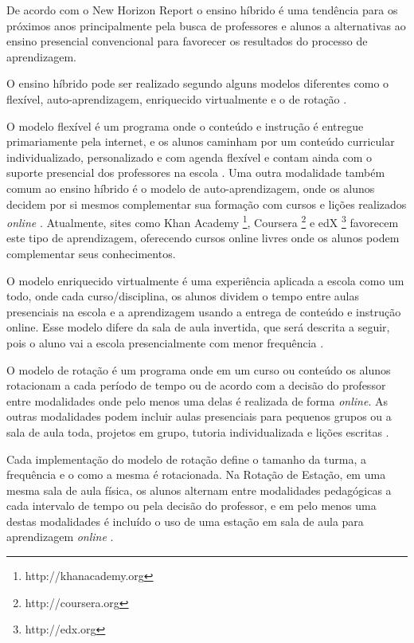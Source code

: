 
De acordo com o New Horizon Report \cite{horizon_report_he_2015} o ensino híbrido é uma tendência para os próximos anos principalmente pela busca de professores e alunos a alternativas ao ensino presencial convencional para favorecer os resultados do processo de aprendizagem.

O ensino híbrido pode ser realizado segundo alguns modelos diferentes como o flexível, auto-aprendizagem, enriquecido virtualmente e o de rotação \cite{staker_classifying_2012}.


O modelo flexível é um programa onde o conteúdo e instrução é entregue primariamente pela internet, e os alunos caminham por um conteúdo curricular individualizado, personalizado e com agenda flexível e contam ainda com o suporte presencial dos professores na escola \cite{staker_classifying_2012}. Uma outra modalidade também comum ao ensino híbrido é o modelo de auto-aprendizagem, onde os alunos decidem por si mesmos complementar sua formação com cursos e lições realizados \emph{online} \cite{horn_rise_2011}. Atualmente, sites como Khan Academy \footnote{http://khanacademy.org}, Coursera \footnote{http://coursera.org} e edX \footnote{http://edx.org} favorecem este tipo de aprendizagem, oferecendo cursos online livres onde os alunos podem complementar seus conhecimentos.

O modelo enriquecido virtualmente é uma experiência aplicada a escola como um todo, onde cada curso/disciplina, os alunos dividem o tempo entre aulas presenciais na escola e a aprendizagem usando a entrega de conteúdo e instrução online. Esse modelo difere da sala de aula invertida, que será descrita a seguir, pois o aluno vai a escola presencialmente com menor frequência \cite{staker_classifying_2012}.


O modelo de rotação é um programa onde em um curso ou conteúdo os alunos rotacionam a cada período de tempo ou de acordo com a decisão do professor entre modalidades onde pelo menos uma delas é realizada de forma \emph{online}. As outras modalidades podem incluir aulas presenciais para pequenos grupos ou a sala de aula toda, projetos em grupo, tutoria individualizada e lições escritas \cite{staker_classifying_2012}.

Cada implementação do modelo de rotação define o tamanho da turma, a frequência e o como a mesma é rotacionada. Na Rotação de Estação, em uma mesma sala de aula física, os alunos alternam entre modalidades pedagógicas a cada intervalo de tempo ou pela decisão do professor, e em pelo menos uma destas modalidades é incluído o uso de uma estação em sala de aula para aprendizagem \emph{online} \cite{staker_classifying_2012}.

